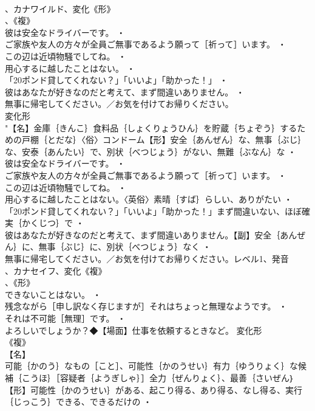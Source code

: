 \documentclass[8pt]{extreport}
\begin{document}
\begin{CJK}{UTF8}{min}
\\	、カナワイルド、変化《形》
\\	、《複》
\\	彼は安全なドライバーです。 ・
\\	ご家族や友人の方々が全員ご無事であるよう願って［祈って］います。 ・
\\	この辺は近頃物騒でしてね。 ・
\\	用心するに越したことはない。 ・
\\	「20ポンド貸してくれない？」「いいよ」「助かった！」 ・
\\	彼はあなたが好きなのだと考えて、まず間違いありません。 ・
\\	無事に帰宅してください。／お気を付けてお帰りください。
\\	変化形 
\\	"【名】金庫｛きんこ｝食料品｛しょくりょうひん｝を貯蔵｛ちょぞう｝するための戸棚｛とだな｝〈俗〉コンドーム【形】安全｛あんぜん｝な、無事｛ぶじ｝な、安泰｛あんたい｝で、別状｛べつじょう｝がない、無難｛ぶなん｝な ・
\\	彼は安全なドライバーです。 ・
\\	ご家族や友人の方々が全員ご無事であるよう願って［祈って］います。 ・
\\	この辺は近頃物騒でしてね。 ・
\\	用心するに越したことはない。〈英俗〉素晴｛すば｝らしい、ありがたい ・
\\	「20ポンド貸してくれない？」「いいよ」「助かった！」まず間違いない、ほぼ確実｛かくじつ｝で ・
\\	彼はあなたが好きなのだと考えて、まず間違いありません。【副】安全｛あんぜん｝に、無事｛ぶじ｝に、別状｛べつじょう｝なく ・
\\	無事に帰宅してください。／お気を付けてお帰りください。レベル1、発音
\\	、カナセイフ、変化《複》
\\	、《形》
\\	できないことはない。 ・
\\	残念ながら［申し訳なく存じますが］それはちょっと無理なようです。 ・
\\	それは不可能［無理］です。 ・
\\	よろしいでしょうか？◆【場面】仕事を依頼するときなど。	変化形 
\\	《複》
\\	【名】
\\	可能｛かのう｝なもの［こと］、可能性｛かのうせい｝有力｛ゆうりょく｝な候補｛こうほ｝［容疑者｛ようぎしゃ｝］全力｛ぜんりょく｝、最善｛さいぜん｝【形】可能性｛かのうせい｝がある、起こり得る、あり得る、なし得る、実行｛じっこう｝できる、できるだけの ・

\end{CJK}
\end{document}
